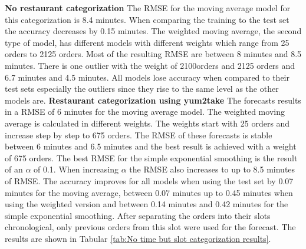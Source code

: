 \newline\textbf{No restaurant categorization}\newline
The RMSE for the moving average model for this categorization is 8.4 minutes. When comparing the training to the test set the accuracy decreases by 0.15 minutes. The weighted moving average, the second type of model, has different models with different weights which range from 25 orders to 2125 orders. Most of the resulting RMSE are between 8 minutes and 8.5 minutes. There is one outlier with the weight of 2100orders and 2125 orders and 6.7 minutes and 4.5 minutes. All models lose accuracy when compared to their test sets especially the outliers since they rise to the same level as the other models are.\newline
\newline\newline\textbf{Restaurant categorization using yum2take}\newline
The forecasts results in a RMSE of 6 minutes for the moving average model. The weighted moving average is calculated in different weights. The weights start with 25 orders and increase step by step to 675 orders. The RMSE of these forecasts is stable between 6 minutes and 6.5 minutes and the best result is achieved with a weight of 675 orders. The best RMSE for the simple exponential smoothing is the result of an $\alpha$ of 0.1. When increasing $\alpha$ the RMSE also increases to up to 8.5 minutes of RMSE. The accuracy improves for all models when using the test set by 0.07 minutes for the moving average, between 0.07 minutes up to 0.45 minutes when using the weighted version and between 0.14 minutes and 0.42 minutes for the simple exponential smoothing.
After separating the orders into their slots chronological, only previous orders from this slot were used for the forecast. The results are shown in Tabular \ref{tab:No time but slot categorization results}.
